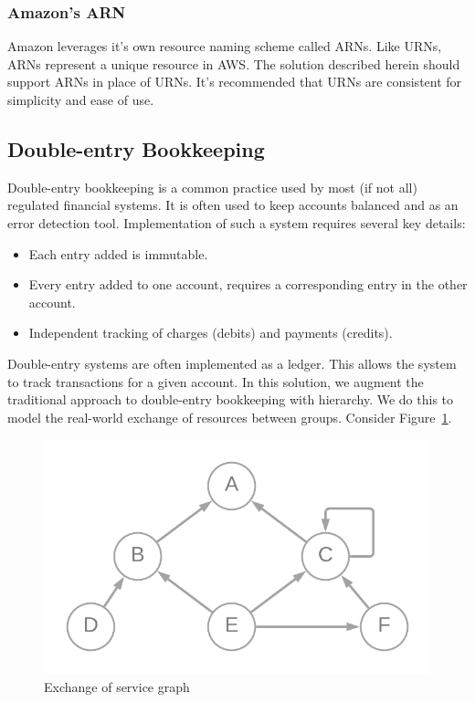 \documentclass[10pt, a4paper, twocolumn]{article}
\begin{document}
    \subsubsection*{Amazon's ARN}
      Amazon leverages it's own resource naming scheme called ARNs.
      Like URNs, ARNs represent a unique resource in AWS.
      The solution described herein should support ARNs in place of URNs.
      It's recommended that URNs are consistent for simplicity and ease of use.

  \subsection*{Double-entry Bookkeeping}
    Double-entry bookkeeping is a common practice used by most (if not all) regulated financial systems.
    It is often used to keep accounts balanced and as an error detection tool.
    Implementation of such a system requires several key details:

    \begin{itemize}
      \item Each entry added is immutable.
      \item Every entry added to one account, requires a corresponding entry in the other account.
      \item Independent tracking of charges (debits) and payments (credits).
    \end{itemize}

    Double-entry systems are often implemented as a ledger.
    This allows the system to track transactions for a given account.
    In this solution, we augment the traditional approach to double-entry bookkeeping with hierarchy.
    We do this to model the real-world exchange of resources between groups.
    Consider Figure~\ref{figure:2}.

    \begin{figure}[H]
      \centering
      \includegraphics[width=\linewidth]{./cost-attribution-graph.png}
      \caption{Exchange of service graph}
      \label{figure:2}
    \end{figure}
\end{document}
